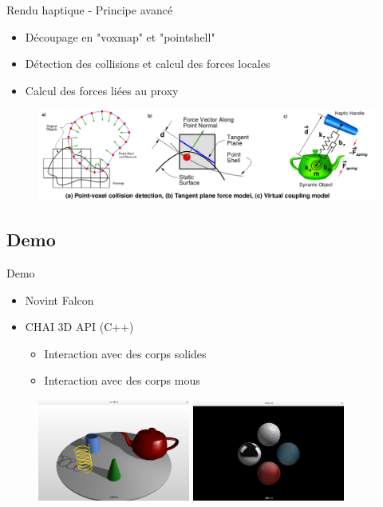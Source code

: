 {
\begin{frame}{Rendu haptique - Principe avancé}
\begin{itemize}
\item Découpage en "voxmap" et "pointshell"
\item Détection des collisions et calcul des forces locales
\item Calcul des forces liées au proxy
\end{itemize}
\begin{figure}
\centering
\includegraphics[width=\linewidth]{images/hapticVoxel_corrected}
\end{figure}
\end{frame}
}

\subsection{Demo}
{
\begin{frame}{Demo}
\begin{itemize}
\item Novint Falcon
\item CHAI 3D API (C++)
\begin{itemize}
\item Interaction avec des corps solides
\item Interaction avec des corps mous
\end{itemize}
\end{itemize}
\begin{figure}
\centering
\includegraphics[width=5cm]{images/demo_solides}
\includegraphics[width=5cm]{images/demo_textures}
\end{figure}
\end{frame}
}